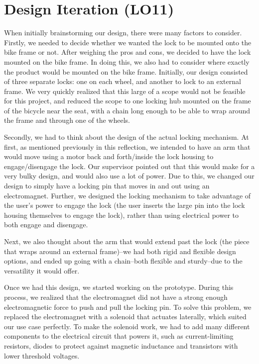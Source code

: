 \documentclass{article}
\begin{document}
\section{Design Iteration (LO11)} 

When initially brainstorming our design, there were many factors to consider. Firstly, we needed to decide whether we wanted the lock to be mounted onto the bike frame or not. After weighing the pros and cons, we decided to have the lock mounted on the bike frame. In doing this, we also had to consider where exactly the product would be mounted on the bike frame. Initially, our design consisted of three separate locks: one on each wheel, and another to lock to an external frame. We very quickly realized that this large of a scope would not be feasible for this project, and reduced the scope to one locking hub mounted on the frame of the bicycle near the seat, with a chain long enough to be able to wrap around the frame and through one of the wheels.

Secondly, we had to think about the design of the actual locking mechanism. At first, as mentioned previously in this reflection, we intended to have an arm that would move using a motor back and forth/inside the lock housing to engage/disengage the lock. Our supervisor pointed out that this would make for a very bulky design, and would also use a lot of power. Due to this, we changed our design to simply have a locking pin that moves in and out using an electromagnet. Further, we designed the locking mechanism to take advantage of the user's power to engage the lock (the user inserts the large pin into the lock housing themselves to engage the lock), rather than using electrical power to both engage and disengage.

Next, we also thought about the arm that would extend past the lock (the piece that wraps around an external frame)--we had both rigid and flexible design options, and ended up going with a chain--both flexible and sturdy--due to the versatility it would offer. 

Once we had this design, we started working on the prototype. During this process, we realized that the electromagnet did not have a strong enough electromagnetic force to push and pull the locking pin. To solve this problem, we replaced the electromagnet with a solenoid that actuates laterally, which suited our use case perfectly. To make the solenoid work, we had to add many different components to the electrical circuit that powers it, such as current-limiting resistors, diodes to protect against magnetic inductance and transistors with lower threshold voltages. 
\end{document}
